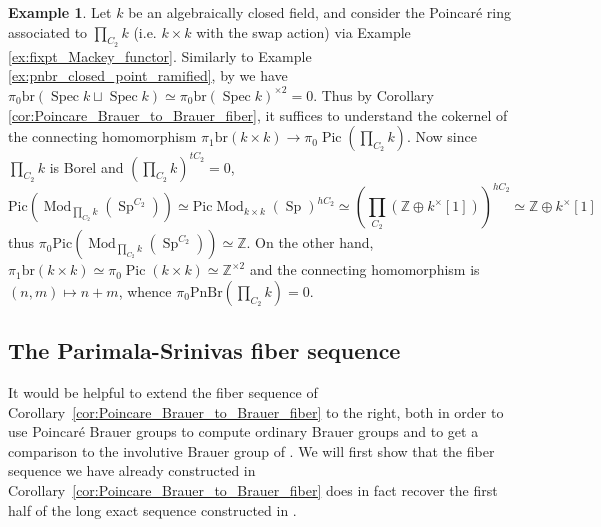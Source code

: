 \documentclass{article}
\DeclareMathOperator{\Spec}{Spec}
\DeclareMathOperator{\Mod}{Mod} %
\DeclareMathOperator{\Pic}{Pic} %
\DeclareMathOperator{\Spectra}{Sp} %
\newcommand{\ZZ}{\mathbb{Z}}
\newcommand{\pnbr}{\ensuremath{\mathrm{PnBr}}}
\newcommand{\pic}{\ensuremath{\mathrm{Pic}}}
\theoremstyle{definition}
\newtheorem{example}[equation]{Example}
\begin{document}
\begin{example}\label{ex:pnbr_closed_pt_unramified}
    Let $ k $ be an algebraically closed field, and consider the Poincar\'e ring associated to $ \prod_{C_2} k $ (i.e. $ k \times k $ with the swap action) via Example \ref{ex:fixpt_Mackey_functor}. 
    Similarly to Example \ref{ex:pnbr_closed_point_ramified}, by \cite[Proposition 1.9]{MR2957304} we have $ \pi_0 \mathrm{br}(\Spec k \sqcup \Spec k) \simeq \pi_0 \mathrm{br}(\Spec k)^{\times 2} = 0 $. 
    Thus by Corollary \ref{cor:Poincare_Brauer_to_Brauer_fiber}, it suffices to understand the cokernel of the connecting homomorphism $ \pi_1 \mathrm{br}(k \times k) \to \pi_0 \Pic(\prod_{C_2} k) $. 
    Now since $ \prod_{C_2} k $ is Borel and $(\prod_{C_2}k)^{tC_2}=0$, 
    \begin{equation*}
        \pic\left(\Mod_{\prod_{C_2} k}\left(\Spectra^{C_2}\right) \right) \simeq \pic \Mod_{k \times k}(\Spectra)^{hC_2} \simeq \left(\prod_{C_2} (\ZZ \oplus  k^\times[1])\right)^{hC_2} \simeq \ZZ \oplus k^\times [1] 
    \end{equation*}
    thus $ \pi_0 \pic\left(\Mod_{\prod_{C_2} k}\left(\Spectra^{C_2}\right) \right) \simeq \ZZ $. 
    On the other hand, $ \pi_1 \mathrm{br}(k \times k) \simeq \pi_0 \Pic(k \times k) \simeq \ZZ^{\times 2} $ and the connecting homomorphism is $ (n, m) \mapsto n+m $, whence $ \pi_0\pnbr\left(\prod_{C_2} k\right) = 0 $. 
\end{example}

\subsection{The Parimala-Srinivas fiber sequence}

It would be helpful to extend the fiber sequence of Corollary~\ref{cor:Poincare_Brauer_to_Brauer_fiber} to the right, both in order to use Poincar{\'e} Brauer groups to compute ordinary Brauer groups and to get a comparison to the involutive Brauer group of \cite{MR1162189}. We will first show that the fiber sequence we have already constructed in Corollary~\ref{cor:Poincare_Brauer_to_Brauer_fiber} does in fact recover the first half of the long exact sequence constructed in \cite[Theorem 2]{MR1162189}.
\end{document}

